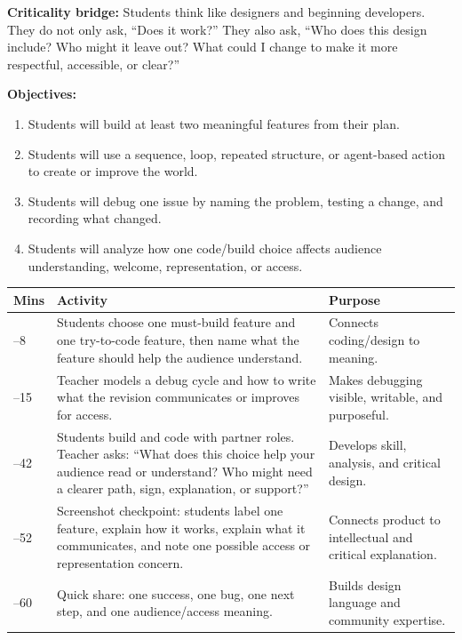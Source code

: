 \textbf{Criticality bridge:} \textcolor{LessonTwoAccent}{Students think like designers and beginning developers. They do not only ask, ``Does it work?'' They also ask, ``Who does this design include? Who might it leave out? What could I change to make it more respectful, accessible, or clear?''}

\textbf{Objectives:}
\begin{enumerate}[leftmargin=*]
    \item Students will build at least two meaningful features from their plan.
    \item Students will use a sequence, loop, repeated structure, or agent-based action to create or improve the world.
    \item Students will debug one issue by naming the problem, testing a change, and recording what changed.
    \item Students will analyze how one code/build choice affects audience understanding, welcome, representation, or access.
\end{enumerate}

\renewcommand{\arraystretch}{0.82}
\setlength{\tabcolsep}{3pt}
\begin{tabularx}{\textwidth}{|>{\raggedright\arraybackslash}p{}|Y|Y|}
\hline
{}
\textbf{Mins} & \textbf{Activity} & \textbf{Purpose} \\ --8 & Students choose one must-build feature and one try-to-code feature, then name what the feature should help the audience understand. & Connects coding/design to meaning. \\ --15 & Teacher models a debug cycle and how to write what the revision communicates or improves for access. & Makes debugging visible, writable, and purposeful. \\ --42 & Students build and code with partner roles. Teacher asks: ``What does this choice help your audience read or understand? Who might need a clearer path, sign, explanation, or support?'' & Develops skill, analysis, and critical design. \\ --52 & Screenshot checkpoint: students label one feature, explain how it works, explain what it communicates, and note one possible access or representation concern. & Connects product to intellectual and critical explanation. \\ --60 & Quick share: one success, one bug, one next step, and one audience/access meaning. & Builds design language and community expertise. \\ \hline
\end{tabularx}

